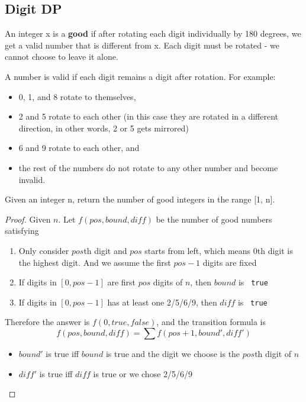 \documentclass[11pt]{article}
\let\OldTexttt\texttt
\renewcommand{\texttt}[1]{\OldTexttt{\color{MidnightBlue} #1}}
\begin{document}
\subsection{Digit DP}
\label{sec:orgb5eb137}
\begin{problem}
An integer x is a \textbf{good} if after rotating each digit individually by 180 degrees, we get a valid
number that is different  from x. Each digit must be rotated - we cannot choose to leave it alone.

A number is valid if each digit remains a digit after rotation. For example:
\begin{itemize}
\item 0, 1, and 8 rotate to themselves,
\item 2 and 5 rotate to each other (in this case they are rotated in a different direction, in other
words, 2 or 5 gets mirrored)
\item 6 and 9 rotate to each other, and
\item the rest of the numbers do not rotate to any other number and become invalid.
\end{itemize}

Given an integer n, return the number of good integers in the range [1, n].
\end{problem}

\begin{proof}
Given \(n\).
Let \(f(pos,bound,diff)\) be the number of good numbers satisfying
\begin{enumerate}
\item Only consider \(pos\)th digit and \(pos\) starts from left, which means 0th digit is the
highest digit. And we assume the first \(pos-1\)
digits are fixed
\item If digits in \([0,pos-1]\) are first \(pos\) digits of \(n\), then \(bound\) is \texttt{true}
\item If digits in \([0,pos-1]\) has at least one 2/5/6/9, then \(diff\) is \texttt{true}
\end{enumerate}

Therefore the answer is \(f(0, true, false)\), and the transition formula is
\begin{equation*}
f(pos,bound,diff)=\sum f(pos+1,bound',diff')
\end{equation*}
\begin{itemize}
\item \(bound'\) is true iff \(bound\) is true and the digit we choose is the \(pos\)th digit
of \(n\)
\item \(diff'\) is true iff \(diff\) is true or we chose 2/5/6/9
\end{itemize}
\end{proof}
\end{document}
